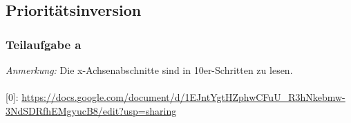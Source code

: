 \documentclass{article}
\newcommand{\sus}[1]{	%
	\subsection*{#1}
}
\newcommand{\sss}[1]{	%
	\subsubsection*{Teilaufgabe #1}
}
\begin{document}
\sus{Prioritätsinversion}
\sss{a}
\textit{Anmerkung:} Die x-Achsenabschnitte sind in 10er-Schritten zu lesen.
\paragraph*{}
\paragraph*{}
[0]: \href{https://docs.google.com/document/d/1EJntYgtHZphwCFuU_R3hNkebmw-3NdSDRfhEMgyucB8/edit?usp=sharing}{https://docs.google.com/document/d/1EJntYgtHZphwCFuU\_R3hNkebmw-3NdSDRfhEMgyucB8/edit?usp=sharing}
\end{document}
